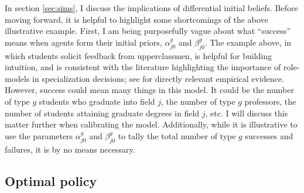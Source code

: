 \documentclass[11 pt]{article}
\newcommand{\toedit}[1]{{\color{gray}#1}}
\newcommand{\toedit}[1]{#1}
\newcommand{\footnts}[1]{\nts{\footnote{\nts{#1}}}}
\newcommand{\footnts}[1]{}
\begin{document}
In section \ref{sec:sims}, I discuss the implications of differential initial beliefs.
Before moving forward, it is helpful to highlight some shortcomings of the above illustrative example.
First, I am being purposefully vague about what ``success'' means when agents form their initial priors, $\alpha_{j0}^g$ and $\beta_{j0}^g$.
The example above, in which students solicit feedback from upperclassmen, is helpful for building intuition, and is consistent with the literature highlighting the importance of role-models in specialization decisions; see \textcite{PS20} for directly relevant empirical evidence.
However, success could mean many things in this model. 
It could be the number of type $g$ students who graduate into field $j$, the number of type $g$ professors, the number of students attaining graduate degrees in field $j$, etc. 
I will discuss this matter further when calibrating the model.\footnts{Make sure I do this!}
\toedit{Additionally, while it is illustrative to use the parameters $\alpha_{j0}^g$ and $\beta_{j0}^g$ to tally the total number of type $g$ successes and failures, it is by no means necessary.}


\subsection{Optimal policy}\label{sec:optimal_policy}
\end{document}
